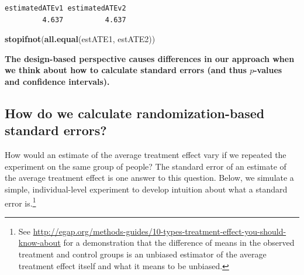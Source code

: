 \documentclass[
  12pt,
]{book}
\newenvironment{Shaded}{\begin{snugshade}}{\end{snugshade}}
\newcommand{\CommentTok}[1]{\textcolor[rgb]{0.56,0.35,0.01}{\textit{#1}}}
\newcommand{\DataTypeTok}[1]{\textcolor[rgb]{0.13,0.29,0.53}{#1}}
\newcommand{\DecValTok}[1]{\textcolor[rgb]{0.00,0.00,0.81}{#1}}
\newcommand{\KeywordTok}[1]{\textcolor[rgb]{0.13,0.29,0.53}{\textbf{#1}}}
\newcommand{\NormalTok}[1]{#1}
\newcommand{\OperatorTok}[1]{\textcolor[rgb]{0.81,0.36,0.00}{\textbf{#1}}}
\newcommand{\StringTok}[1]{\textcolor[rgb]{0.31,0.60,0.02}{#1}}
\theoremstyle{definition}
\theoremstyle{definition}
\theoremstyle{definition}
\theoremstyle{remark}
\begin{document}
\begin{Shaded}
\end{Shaded}

\begin{verbatim}
estimatedATEv1 estimatedATEv2 
         4.637          4.637 
\end{verbatim}

\begin{Shaded}
\begin{Highlighting}[]
\KeywordTok{stopifnot}\NormalTok{(}\KeywordTok{all.equal}\NormalTok{(estATE1, estATE2))}
\end{Highlighting}
\end{Shaded}

\textbf{The design-based perspective causes differences in our approach
when we think about how to calculate standard errors (and thus
\(p\)-values and confidence intervals).}

\hypertarget{how-do-we-calculate-randomization-based-standard-errors}{%
\subsection{How do we calculate randomization-based standard
errors?}\label{how-do-we-calculate-randomization-based-standard-errors}}

How would an estimate of the average treatment effect vary if we
repeated the experiment on the same group of people? The standard error
of an estimate of the average treatment effect is one answer to this
question. Below, we simulate a simple, individual-level experiment to
develop intuition about what a standard error is.\footnote{See
  \url{http://egap.org/methods-guides/10-types-treatment-effect-you-should-know-about}
  for a demonstration that the difference of means in the observed
  treatment and control groups is an unbiased estimator of the average
  treatment effect itself and what it means to be unbiased.}
\end{document}
